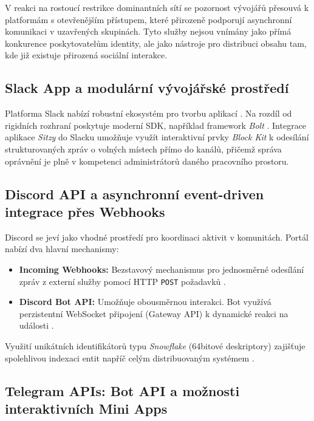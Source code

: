 \documentclass[male,czech,api_bc]{kitheses}
\begin{document}
V reakci na rostoucí restrikce dominantních sítí se pozornost vývojářů přesouvá k platformám s otevřenějším přístupem, které přirozeně podporují asynchronní komunikaci v uzavřených skupinách. Tyto služby nejsou vnímány jako přímá konkurence poskytovatelům identity, ale jako nástroje pro distribuci obsahu tam, kde již existuje přirozená sociální interakce.

\subsection{Slack App a modulární vývojářské prostředí}

Platforma Slack nabízí robustní ekosystém pro tvorbu aplikací \cite{SlackDocs2026}. Na rozdíl od rigidních rozhraní poskytuje moderní SDK, například framework \textit{Bolt} \cite{SlackDocs2026}. Integrace aplikace \textit{Sitzy} do Slacku umožňuje využít interaktivní prvky \textit{Block Kit} k odesílání strukturovaných zpráv o volných místech přímo do kanálů, přičemž správa oprávnění je plně v kompetenci administrátorů daného pracovního prostoru.

\subsection{Discord API a asynchronní event-driven integrace přes Webhooks}

Discord se jeví jako vhodné prostředí pro koordinaci aktivit v komunitách. Portál nabízí dva hlavní mechanismy:

\begin{itemize}
    \item \textbf{Incoming Webhooks:} Bezstavový mechanismus pro jednosměrné odesílání zpráv z externí služby pomocí HTTP \texttt{POST} požadavků \cite{DiscordDocs2026}.
    \item \textbf{Discord Bot API:} Umožňuje obousměrnou interakci. Bot využívá perzistentní WebSocket připojení (Gateway API) k dynamické reakci na události \cite{DiscordDocs2026}.
\end{itemize}

Využití unikátních identifikátorů typu \textit{Snowflake} (64bitové deskriptory) zajišťuje spolehlivou indexaci entit napříč celým distribuovaným systémem \cite{DiscordDocs2026}.

\subsection{Telegram APIs: Bot API a možnosti interaktivních Mini Apps}
\end{document}
